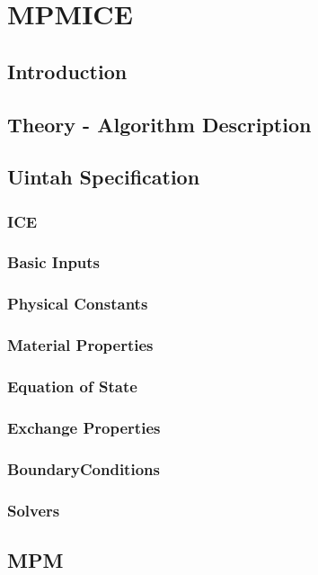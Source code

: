 
\section{MPMICE} \label{Sec:MPMICE}

\subsection{Introduction}

\subsection{Theory - Algorithm Description}

\subsection{Uintah Specification}

\subsubsection{ICE}

\subsubsection{Basic Inputs}
\subsubsection{Physical Constants}
\subsubsection{Material Properties}
\subsubsection{Equation of State}
\subsubsection{Exchange Properties}
\subsubsection{BoundaryConditions}
\subsubsection{Solvers}


\subsection{MPM}

